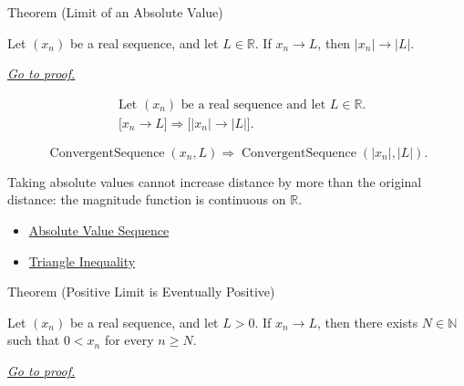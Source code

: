 
\begin{theorembox}{Theorem (Limit of an Absolute Value)}
\begin{theorem}
\label{thm:limit-of-an-absolute-value}
Let $(x_n)$ be a real sequence, and let $L\in\mathbb{R}$. If $x_n\to L$,
then $|x_n|\to |L|$.

\smallskip
\noindent
\hyperref[prf:limit-of-an-absolute-value]{\textit{Go to proof.}}
\end{theorem}
\end{theorembox}

\begin{remark*}
\[
\begin{aligned}
&\text{Let } (x_n) \text{ be a real sequence and let } L\in\mathbb{R}.\\
&\bigl[x_n\to L\bigr]
\Longrightarrow
\bigl[|x_n|\to |L|\bigr].
\end{aligned}
\]
\end{remark*}

\begin{remark*}
\[
\operatorname{ConvergentSequence}(x_n,L)
\Longrightarrow
\operatorname{ConvergentSequence}(|x_n|,|L|).
\]
\end{remark*}

\begin{remark*}[Interpretation]
Taking absolute values cannot increase distance by more than the original
distance: the magnitude function is continuous on $\mathbb{R}$.
\end{remark*}

\begin{dependencies}
\begin{itemize}
  \item \hyperref[def:absolute-value-sequence]{Absolute Value Sequence}
  \item \hyperref[thm:triangle-inequality]{Triangle Inequality}
\end{itemize}
\end{dependencies}


\begin{theorembox}{Theorem (Positive Limit is Eventually Positive)}
\begin{theorem}
\label{thm:positive-limit-eventually-positive}
Let $(x_n)$ be a real sequence, and let $L>0$. If $x_n\to L$, then there
exists $N\in\mathbb{N}$ such that $0<x_n$ for every $n\ge N$.

\smallskip
\noindent
\hyperref[prf:positive-limit-eventually-positive]{\textit{Go to proof.}}
\end{theorem}
\end{theorembox}

